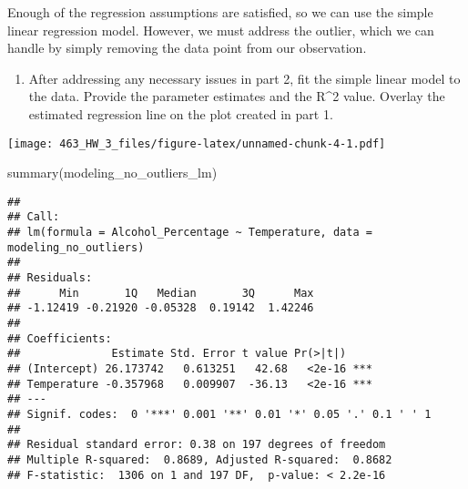 \documentclass[
]{article}
\newenvironment{Shaded}{\begin{snugshade}}{\end{snugshade}}
\newcommand{\AttributeTok}[1]{\textcolor[rgb]{0.77,0.63,0.00}{#1}}
\newcommand{\DecValTok}[1]{\textcolor[rgb]{0.00,0.00,0.81}{#1}}
\newcommand{\FunctionTok}[1]{\textcolor[rgb]{0.00,0.00,0.00}{#1}}
\newcommand{\NormalTok}[1]{#1}
\newcommand{\OtherTok}[1]{\textcolor[rgb]{0.56,0.35,0.01}{#1}}
\newcommand{\SpecialCharTok}[1]{\textcolor[rgb]{0.00,0.00,0.00}{#1}}
\newcommand{\StringTok}[1]{\textcolor[rgb]{0.31,0.60,0.02}{#1}}
\providecommand{\tightlist}{%
  \setlength{\itemsep}{0pt}\setlength{\parskip}{0pt}}
\begin{document}
Enough of the regression assumptions are satisfied, so we can use the
simple linear regression model. However, we must address the outlier,
which we can handle by simply removing the data point from our
observation.

\begin{enumerate}
\def\labelenumi{\arabic{enumi})}
\setcounter{enumi}{2}
\tightlist
\item
  After addressing any necessary issues in part 2, fit the simple linear
  model to the data. Provide the parameter estimates and the R\^{}2
  value. Overlay the estimated regression line on the plot created in
  part 1.
\end{enumerate}

\begin{Shaded}
\end{Shaded}

\texttt{[image: 463\_HW\_3\_files/figure-latex/unnamed-chunk-4-1.pdf]}

\begin{Shaded}
\begin{Highlighting}[]
\FunctionTok{summary}\NormalTok{(modeling\_no\_outliers\_lm)}
\end{Highlighting}
\end{Shaded}

\begin{verbatim}
## 
## Call:
## lm(formula = Alcohol_Percentage ~ Temperature, data = modeling_no_outliers)
## 
## Residuals:
##      Min       1Q   Median       3Q      Max 
## -1.12419 -0.21920 -0.05328  0.19142  1.42246 
## 
## Coefficients:
##              Estimate Std. Error t value Pr(>|t|)    
## (Intercept) 26.173742   0.613251   42.68   <2e-16 ***
## Temperature -0.357968   0.009907  -36.13   <2e-16 ***
## ---
## Signif. codes:  0 '***' 0.001 '**' 0.01 '*' 0.05 '.' 0.1 ' ' 1
## 
## Residual standard error: 0.38 on 197 degrees of freedom
## Multiple R-squared:  0.8689, Adjusted R-squared:  0.8682 
## F-statistic:  1306 on 1 and 197 DF,  p-value: < 2.2e-16
\end{verbatim}
\end{document}
